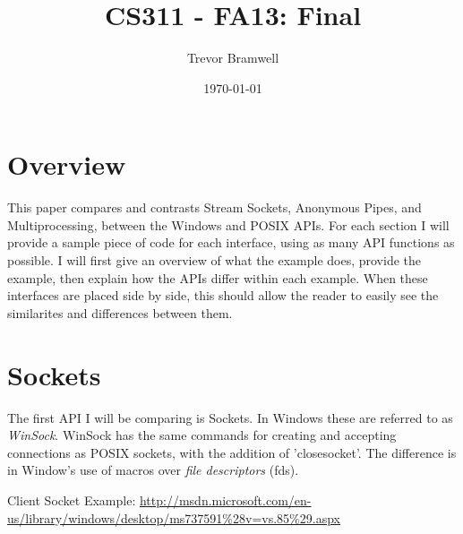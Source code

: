\documentclass[letterpaper,10pt]{article}
\title{CS311 - FA13: Final}
\date{\today}
\author{Trevor Bramwell}
\begin{document}
\maketitle

\section{Overview}

This paper compares and contrasts Stream Sockets, Anonymous Pipes, and
Multiprocessing, between the Windows and POSIX APIs. For each section I
will provide a sample piece of code for each interface, using as many
API functions as possible. I will first give an overview of what the
example does, provide the example, then explain how the APIs differ
within each example. When these interfaces are placed side by side, this
should allow the reader to easily see the similarites and differences
between them.

\section{Sockets}

The first API I will be comparing is Sockets. In Windows these are
referred to as \emph{WinSock}. WinSock has the same commands for
creating and accepting connections as POSIX sockets, with the addition
of 'closesocket'. The difference is in Window's use of macros over
\emph{file descriptors} (fds).

Client Socket Example: \url{http://msdn.microsoft.com/en-us/library/windows/desktop/ms737591\%28v=vs.85%29.aspx}
\end{document}
